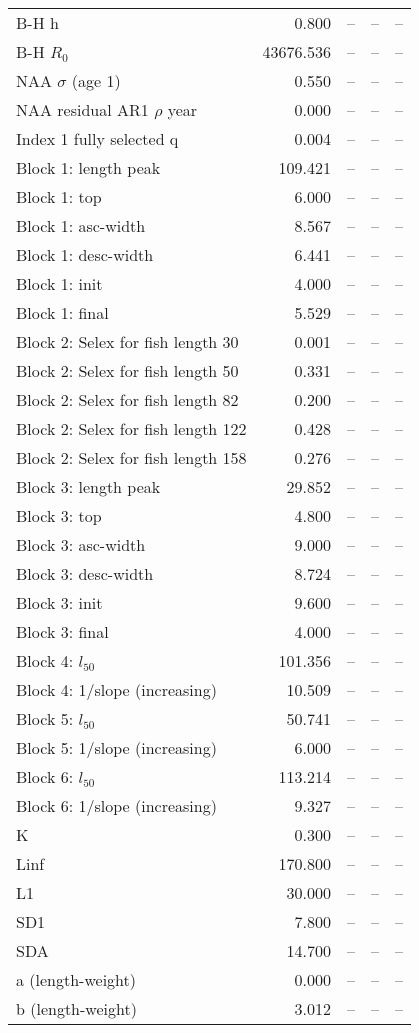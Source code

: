 \documentclass[
]{article}
\begin{document}
\begin{landscape}
\begin{longtable}[t]{lrrrr}
\endfoot
\bottomrule
\endlastfoot
B-H h & 0.800 & -- & -- & --\\
B-H $R_0$ & 43676.536 & -- & -- & --\\
NAA $\sigma$ (age 1) & 0.550 & -- & -- & --\\
NAA residual AR1 $\rho$ year & 0.000 & -- & -- & --\\
Index 1 fully selected q & 0.004 & -- & -- & --\\
\addlinespace
Block 1: length peak & 109.421 & -- & -- & --\\
Block 1: top & 6.000 & -- & -- & --\\
Block 1: asc-width & 8.567 & -- & -- & --\\
Block 1: desc-width & 6.441 & -- & -- & --\\
Block 1: init & 4.000 & -- & -- & --\\
\addlinespace
Block 1: final & 5.529 & -- & -- & --\\
Block 2: Selex for fish length 30 & 0.001 & -- & -- & --\\
Block 2: Selex for fish length 50 & 0.331 & -- & -- & --\\
Block 2: Selex for fish length 82 & 0.200 & -- & -- & --\\
Block 2: Selex for fish length 122 & 0.428 & -- & -- & --\\
\addlinespace
Block 2: Selex for fish length 158 & 0.276 & -- & -- & --\\
Block 3: length peak & 29.852 & -- & -- & --\\
Block 3: top & 4.800 & -- & -- & --\\
Block 3: asc-width & 9.000 & -- & -- & --\\
Block 3: desc-width & 8.724 & -- & -- & --\\
\addlinespace
Block 3: init & 9.600 & -- & -- & --\\
Block 3: final & 4.000 & -- & -- & --\\
Block 4: $l_{50}$ & 101.356 & -- & -- & --\\
Block 4: 1/slope (increasing) & 10.509 & -- & -- & --\\
Block 5: $l_{50}$ & 50.741 & -- & -- & --\\
\addlinespace
Block 5: 1/slope (increasing) & 6.000 & -- & -- & --\\
Block 6: $l_{50}$ & 113.214 & -- & -- & --\\
Block 6: 1/slope (increasing) & 9.327 & -- & -- & --\\
K & 0.300 & -- & -- & --\\
Linf & 170.800 & -- & -- & --\\
\addlinespace
L1 & 30.000 & -- & -- & --\\
SD1 & 7.800 & -- & -- & --\\
SDA & 14.700 & -- & -- & --\\
a (length-weight) & 0.000 & -- & -- & --\\
b (length-weight) & 3.012 & -- & -- & --\\*
\end{longtable}
\end{landscape}
\end{document}

